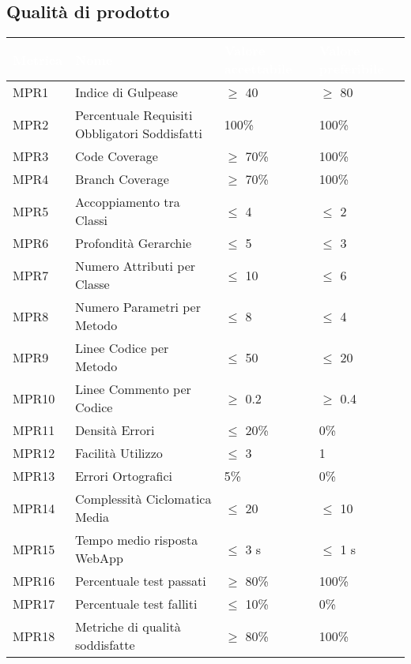 \subsection{Qualità di prodotto}
{

    \setlength{\freewidth}{\dimexpr\textwidth-10\tabcolsep}
    \renewcommand{\arraystretch}{1.5}
    \centering
    \setlength{\aboverulesep}{0pt}
    \setlength{\belowrulesep}{0pt}
    \begin{longtable}{C{.257\freewidth} C{.257\freewidth} C{.257\freewidth} C{.257\freewidth}}
       \toprule
    \textcolor{white}{\textbf{Metrica}}&
    \textcolor{white}{\textbf{Nome}}&
    \textcolor{white}{\textbf{Valore accettabile}}&
    \textcolor{white}{\textbf{Valore preferibile}}\\	
    \toprule
    \endhead
    
    
    MPR1 & Indice di Gulpease & $\geq$ 40 & $\geq$ 80 \\
    MPR2 & Percentuale Requisiti Obbligatori Soddisfatti & 100\% & 100\% \\
    MPR3 & Code Coverage & $\geq$ 70\% & 100\% \\
    MPR4 & Branch Coverage & $\geq$ 70\% & 100\% \\
    MPR5 & Accoppiamento tra Classi & $\leq$ 4 & $\leq$ 2 \\
    MPR6 & Profondità Gerarchie & $\leq$ 5 & $\leq$ 3 \\
    MPR7 & Numero Attributi per Classe & $\leq$ 10 & $\leq$ 6 \\
    MPR8 & Numero Parametri per Metodo & $\leq$ 8 & $\leq$ 4 \\
    MPR9 & Linee Codice per Metodo & $\leq$ 50 & $\leq$ 20 \\
    MPR10 & Linee Commento per Codice & $\geq$ 0.2 & $\geq$ 0.4 \\
    MPR11 & Densità Errori & $\leq$ 20\% & 0\% \\
    MPR12 & Facilità Utilizzo  & $\leq$ 3 & 1 \\
    MPR13 & Errori Ortografici & 5\% & 0\% \\
    MPR14 & Complessità Ciclomatica Media & $\leq$ 20 & $\leq$ 10 \\
    MPR15 & Tempo medio risposta WebApp & $\leq$ 3 s & $\leq$ 1 s \\
    MPR16 & Percentuale test passati & $\geq$ 80\% & 100\% \\
    MPR17 & Percentuale test falliti & $\leq$ 10\% & 0\% \\
    MPR18 & Metriche di qualità soddisfatte & $\geq$ 80\% & 100\% \\	   
    \bottomrule
    \end{longtable}
}